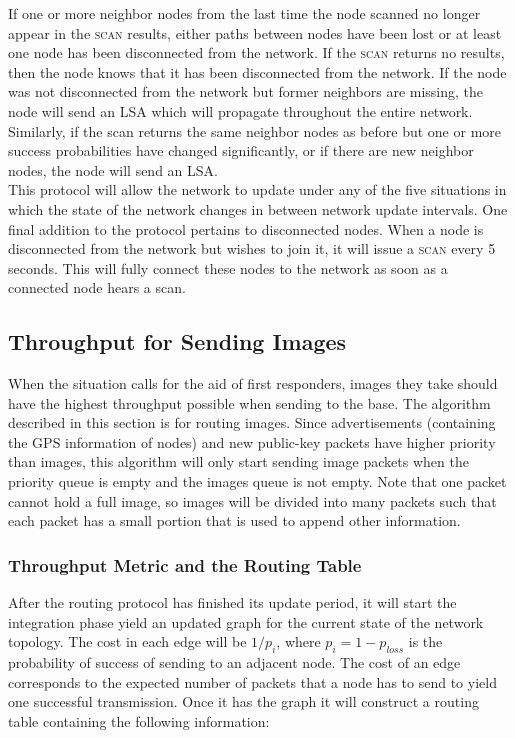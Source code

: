 \documentclass[letterpaper]{article}
\begin{document}
\noindent If one or more neighbor nodes from the last time the node scanned no longer appear in 
the \textsc{scan} results, either paths between nodes have been lost or at least one node has
been disconnected from the network. If the \textsc{scan} returns no results, then the node knows
that it has been disconnected from the network. If the node was not disconnected from the network
but former neighbors are missing, the node will send an LSA which will propagate throughout the
entire network. Similarly, if the scan returns the same neighbor nodes as before but one or more
success probabilities have changed significantly, or if there are new neighbor nodes, the node will
send an LSA.
\\

\noindent This protocol will allow the network to update under any of the five situations in which
the state of the network changes in between network update intervals. One final addition to the
protocol pertains to disconnected nodes. When a node is disconnected from the network but wishes to
join it, it will issue a \textsc{scan} every 5 seconds. This will fully connect these nodes to the
network as soon as a connected node hears a scan. 

\subsection{Throughput for Sending Images}

When the situation calls for the aid of first responders, images they take should
have the highest throughput possible when sending to the base. The algorithm described in this section
is for routing images. Since advertisements (containing the GPS information of nodes) and
new public-key packets have higher priority than images, this algorithm will only start sending image
packets when the priority queue is empty and the images queue is not empty. Note that one packet
cannot hold a full image, so images will be divided into many packets such that each packet has a
small portion that is used to append other information.

\subsubsection{Throughput Metric and the Routing Table}

After the routing protocol has finished its update period, it will start the integration phase yield an
updated graph for the current state of the network topology. The cost in each edge will be $1/p_{i}$, 
where $p_{i} = 1 - p_{loss}$ is the probability of success of sending to an adjacent node. The cost of an
edge corresponds to the expected number of packets that a node has to send to yield one successful
transmission. Once it has the graph it will construct a routing table containing the following information:
\end{document}

